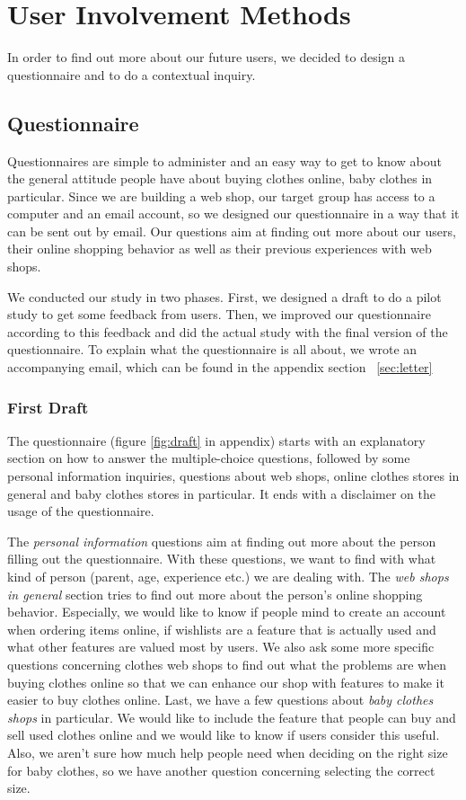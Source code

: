 \section{User Involvement Methods}
In order to find out more about our future users, we decided to design a questionnaire and to do a contextual inquiry. 

\subsection{Questionnaire}
Questionnaires are simple to administer and an easy way to get to know about the general attitude people have about buying clothes online, baby clothes in particular. Since we are building a web shop, our target group has access to a computer and an email account, so we designed our questionnaire in a way that it can be sent out by email. Our questions aim at finding out more about our users, their online shopping behavior as well as their previous experiences with web shops. 

We conducted our study in two phases. First, we designed a draft to do a pilot study to get some feedback from users. Then, we improved our questionnaire according to this feedback and did the actual study with the final version of the questionnaire. To explain what the questionnaire is all about, we wrote an accompanying email, which can be found in the appendix section ~\ref{sec:letter}

\subsubsection{First Draft}
The questionnaire (figure \ref{fig:draft} in appendix) starts with an explanatory section on how to answer the multiple-choice questions, followed by some personal information inquiries, questions about web shops, online clothes stores in general and baby clothes stores in particular. It ends with a disclaimer on the usage of the questionnaire.

The \textit{personal information} questions aim at finding out more about the person filling out the questionnaire. With these questions, we want to find with what kind of person (parent, age, experience etc.) we are dealing with. The \textit{web shops in general} section tries to find out more about the person's online shopping behavior. Especially, we would like to know if people mind to create an account when ordering items online, if wishlists are a feature that is actually used and what other features are valued most by users.
We also ask some more specific questions concerning clothes web shops to find out what the problems are when buying clothes online so that we can enhance our shop with features to make it easier to buy clothes online. 
Last, we have a few questions about \textit{baby clothes shops} in particular. We would like to include the feature that people can buy and sell used clothes online and we would like to know if users consider this useful. Also, we aren't sure how much help people need when deciding on the right size for baby clothes, so we have another question concerning selecting the correct size.

